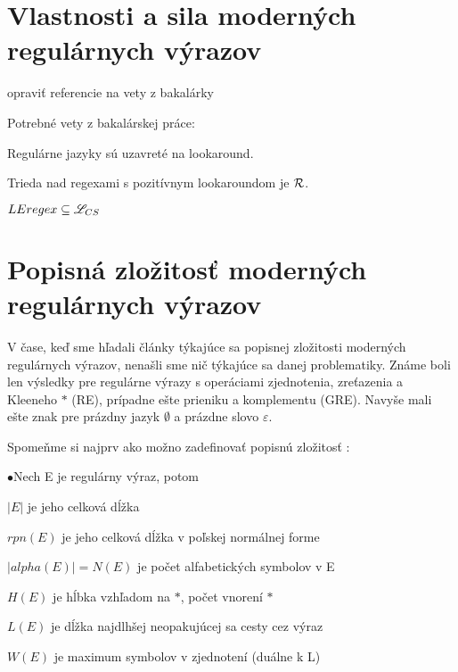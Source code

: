 \section[Vlastnosti a sila]{Vlastnosti a sila moderných regulárnych výrazov}
\label{usila}

\todo opraviť referencie na vety z bakalárky

Potrebné vety z bakalárskej práce:

\begin{veta}[Veta 2.2.5.]\label{lookahead+R}
Regulárne jazyky sú uzavreté na lookaround.
\end{veta}

\begin{veta}[Veta 2.2.10.]\label{lookaround+R}
Trieda nad regexami s pozitívnym lookaroundom je ${\cal R}$.
\end{veta} 

\begin{veta}[Veta 2.2.14.]\label{le+lcs}
$ LEregex \subseteq \mathscr{L}_{CS} $
\end{veta}

\section[Popisná zložitosť]{Popisná zložitosť moderných regulárnych výrazov}
\label{uzlozitost}


V čase, keď sme hľadali články týkajúce sa popisnej zložitosti moderných regulárnych výrazov, nenašli sme nič týkajúce sa danej problematiky. Známe boli len výsledky pre regulárne výrazy s operáciami zjednotenia, zreťazenia a Kleeneho $*$ (RE), prípadne ešte prieniku a komplementu (GRE). Navyše mali ešte znak pre prázdny jazyk $\emptyset$ a prázdne slovo $\varepsilon$.

Spomeňme si najprv ako možno zadefinovať popisnú zložitosť \cite{newResults} \cite{compMeasures75}:

\begin{list}{$\bullet$}{Nech E je regulárny výraz, potom}
\item $|E|$ je jeho celková dĺžka
\item $rpn(E)$ je jeho celková dĺžka v poľskej normálnej forme
\item $|alpha(E)|= N(E)$ je počet alfabetických symbolov v E
\item $H(E)$ je hĺbka vzhľadom na $*$, počet vnorení $*$
\item $L(E)$ je dĺžka najdlhšej neopakujúcej sa cesty cez výraz
\item $W(E)$ je maximum symbolov v zjednotení (duálne k L)
\end{list}

